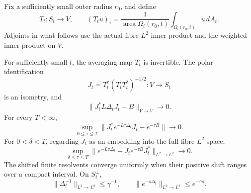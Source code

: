 Fix a sufficiently small outer radius $r_0$, and define
\[
 T_t:S_t\to V,\qquad (T_tu)_i=
 \frac{1}{\operatorname{area}\Omega_i(r_0,t)}
              \int_{\Omega_i(r_0,t)}u\,dA_t.
\]
Adjoints in what follows use the actual fibre $L^2$ inner product and
the weighted inner product on $V$.

\begin{theorem}\label{thm:operator}
For sufficiently small $t$, the averaging map $T_t$ is invertible.
The polar identification
\begin{equation}\label{eq:polar}
 J_t=T_t^*(T_tT_t^*)^{-1/2}:V\longrightarrow S_t
\end{equation}
is an isometry, and
\begin{equation}\label{eq:operator-limit}
 \|J_t^*L\Delta_tJ_t-B\|_{V\to V}\longrightarrow0.
\end{equation}
For every $T<\infty$,
\begin{equation}\label{eq:low-heat}
 \sup_{0\le\tau\le T}
 \|J_t^*e^{-L\tau\Delta_t}J_t-e^{-\tau B}\|\longrightarrow0.
\end{equation}
For $0<\delta<T$, regarding $J_t$ as an embedding into the full
fibre $L^2$ space,
\begin{equation}\label{eq:full-heat}
 \sup_{\delta\le\tau\le T}
 \|e^{-L\tau\Delta_t}-J_te^{-\tau B}J_t^*\|_{L^2\to L^2}
 \longrightarrow0.
\end{equation}
The shifted finite resolvents converge uniformly when their positive
shift ranges over a compact interval. On $S_t^\perp$,
\begin{equation}\label{eq:complement-bounds}
 \|\Delta_t^{-1}\|_{L^2\to L^2}\le\gamma^{-1},\qquad
 \|e^{-s\Delta_t}\|_{L^2\to L^2}\le e^{-\gamma s}.
\end{equation}
\end{theorem}
